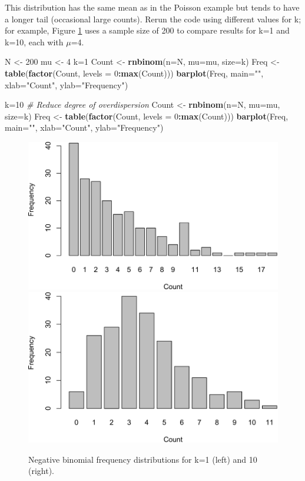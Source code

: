 \documentclass[
]{krantz}
\makeatletter
\newenvironment{Shaded}{\begin{snugshade}}{\end{snugshade}}
\newcommand{\AttributeTok}[1]{\textcolor[rgb]{0.27,0.27,0.27}{#1}}
\newcommand{\CommentTok}[1]{\textcolor[rgb]{0.37,0.37,0.37}{\textit{#1}}}
\newcommand{\DecValTok}[1]{\textcolor[rgb]{0.06,0.06,0.06}{#1}}
\newcommand{\FunctionTok}[1]{\textcolor[rgb]{0.27,0.27,0.27}{\textbf{#1}}}
\newcommand{\NormalTok}[1]{#1}
\newcommand{\OtherTok}[1]{\textcolor[rgb]{0.37,0.37,0.37}{#1}}
\newcommand{\SpecialCharTok}[1]{\textcolor[rgb]{0.43,0.43,0.43}{\textbf{#1}}}
\newcommand{\StringTok}[1]{\textcolor[rgb]{0.5,0.5,0.5}{#1}}
\newenvironment{kframe}{%
\medskip{}
\setlength{\fboxsep}{.8em}
 \def\at@end@of@kframe{}%
 \ifinner\ifhmode%
  \def\at@end@of@kframe{\end{minipage}}%
  \begin{minipage}{\columnwidth}%
 \fi\fi%
 \def\FrameCommand##1{\hskip\@totalleftmargin \hskip-\fboxsep
 \colorbox{shadecolor}{##1}\hskip-\fboxsep
     \hskip-\linewidth \hskip-\@totalleftmargin \hskip\columnwidth}%
 \MakeFramed {\advance\hsize-\width
   \@totalleftmargin\z@ \linewidth\hsize
   \@setminipage}}%
 {\par\unskip\endMakeFramed%
 \at@end@of@kframe}
\renewenvironment{Shaded}{\begin{kframe}}{\end{kframe}}
\makeatother
\begin{document}
This distribution has the same mean as in the Poisson example but tends to have a longer tail (occasional large counts). Rerun the code using different values for k; for example, Figure \ref{fig:NB-vary-k} uses a sample size of 200 to compare results for k=1 and k=10, each with \(\mu\)=4.

\begin{Shaded}
\begin{Highlighting}[]
\NormalTok{N }\OtherTok{\textless{}{-}} \DecValTok{200}
\NormalTok{mu }\OtherTok{\textless{}{-}} \DecValTok{4}
\NormalTok{k}\OtherTok{=}\DecValTok{1}
\NormalTok{Count }\OtherTok{\textless{}{-}} \FunctionTok{rnbinom}\NormalTok{(}\AttributeTok{n=}\NormalTok{N, }\AttributeTok{mu=}\NormalTok{mu, }\AttributeTok{size=}\NormalTok{k)}
\NormalTok{Freq }\OtherTok{\textless{}{-}} \FunctionTok{table}\NormalTok{(}\FunctionTok{factor}\NormalTok{(Count, }\AttributeTok{levels =} \DecValTok{0}\SpecialCharTok{:}\FunctionTok{max}\NormalTok{(Count)))}
\FunctionTok{barplot}\NormalTok{(Freq, }\AttributeTok{main=}\StringTok{""}\NormalTok{, }\AttributeTok{xlab=}\StringTok{"Count"}\NormalTok{, }\AttributeTok{ylab=}\StringTok{"Frequency"}\NormalTok{)}

\NormalTok{k}\OtherTok{=}\DecValTok{10} \CommentTok{\# Reduce degree of overdispersion}
\NormalTok{Count }\OtherTok{\textless{}{-}} \FunctionTok{rnbinom}\NormalTok{(}\AttributeTok{n=}\NormalTok{N, }\AttributeTok{mu=}\NormalTok{mu, }\AttributeTok{size=}\NormalTok{k)}
\NormalTok{Freq }\OtherTok{\textless{}{-}} \FunctionTok{table}\NormalTok{(}\FunctionTok{factor}\NormalTok{(Count, }\AttributeTok{levels =} \DecValTok{0}\SpecialCharTok{:}\FunctionTok{max}\NormalTok{(Count)))}
\FunctionTok{barplot}\NormalTok{(Freq, }\AttributeTok{main=}\StringTok{""}\NormalTok{, }\AttributeTok{xlab=}\StringTok{"Count"}\NormalTok{, }\AttributeTok{ylab=}\StringTok{"Frequency"}\NormalTok{)}
\end{Highlighting}
\end{Shaded}

\begin{figure}
\includegraphics[width=0.5\linewidth]{bookdown_files/figure-latex/NB-vary-k-1} \includegraphics[width=0.5\linewidth]{bookdown_files/figure-latex/NB-vary-k-2} \caption{Negative binomial frequency distributions for k=1 (left) and 10 (right).}\label{fig:NB-vary-k}
\end{figure}
\end{document}

